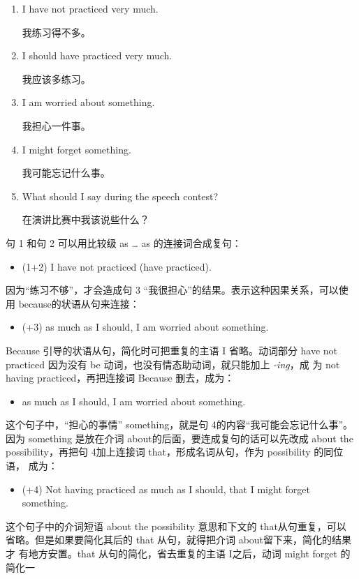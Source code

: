 \begin{enumerate}
\item I have not practiced very much.

  我练习得不多。
\item I should have practiced very much.

  我应该多练习。
\item I am worried about something.

  我担心一件事。
\item I might forget something.

  我可能忘记什么事。
\item What should I say during the speech contest?

  在演讲比赛中我该说些什么？
\end{enumerate}

句 1 和句 2 可以用比较级 as \ldots{} as 的连接词合成复句：
\begin{itemize}
\item (1+2) I have not practiced  (have practiced).
\end{itemize}
因为“练习不够”，才会造成句 3 “我很担心”的结果。表示这种因果关系，可以使
用 because的状语从句来连接：
\begin{itemize}
\item (+3)  as much as I should, I am
  worried about something.
\end{itemize}
Because 引导的状语从句，简化时可把重复的主语 I 省略。动词部分 have not
practiced 因为没有 be 动词，也没有情态助动词，就只能加上 \emph{-ing}，成
为 not having practiced，再把连接词 Because 删去，成为：
\begin{itemize}
\item {} as much as I should, I am worried about something.
\end{itemize}
这个句子中，“担心的事情” something，就是句 4的内容“我可能会忘记什么事”。
因为 something 是放在介词 about的后面，要连成复句的话可以先改成 about the
possibility，再把句 4加上连接词 that，形成名词从句，作为 possibility 的同位语，
成为：
\begin{itemize}
\item (+4) Not having practiced as much as I should,  that I might forget something.
\end{itemize}
这个句子中的介词短语 about the possibility 意思和下文的 that从句重复，可以
省略。但是如果要简化其后的 that 从句，就得把介词 about留下来，简化的结果才
有地方安置。that 从句的简化，省去重复的主语 I之后，动词 might forget 的简化一
